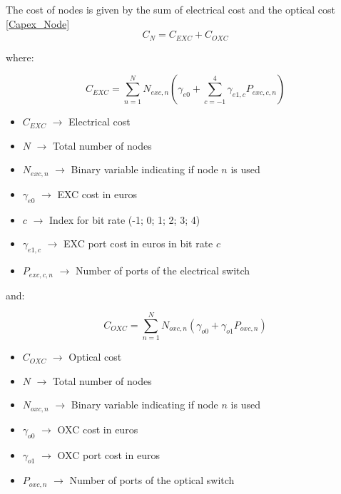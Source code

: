 The cost of nodes is given by the sum of electrical cost and the optical cost \ref{Capex_Node}\\

\begin{equation}
C_N = C_{EXC} + C_{OXC}
\label{Capex_Node}
\end{equation}

where:

\begin{equation}
C_{EXC} = \sum_{n=1}^{N} N_{exc,n} \left( \gamma_{e0} + \sum_{c=-1}^4 \gamma_{e1,c} P_{exc,c,n} \right)
\label{Capex_Node_EXC}
\end{equation}

\begin{itemize}
\item{$C_{EXC}$			$\rightarrow$	Electrical cost}
\item{$N$				$\rightarrow$	Total number of nodes}
\item{$N_{exc,n}$		$\rightarrow$	Binary variable indicating if node $n$ is used}
\item{$\gamma_{e0}$ 	$\rightarrow$	EXC cost in euros}
\item{$c$               $\rightarrow$   Index for bit rate (-1; 0; 1; 2; 3; 4)}
\item{$\gamma_{e1,c}$	$\rightarrow$	EXC port cost in euros in bit rate $c$}
\item{$P_{exc,c,n}$	    $\rightarrow$	Number of ports of the electrical switch}
\end{itemize}

and:

\begin{equation}
C_{OXC} = \sum_{n=1}^{N} N_{oxc,n} ( \gamma_{o0} + \gamma_{o1} P_{oxc,n} )
\label{Capex_Node_OXC}
\end{equation}

\begin{itemize}
\item{$C_{OXC}$			$\rightarrow$	Optical cost}
\item{$N$				$\rightarrow$	Total number of nodes}
\item{$N_{oxc,n}$		$\rightarrow$	Binary variable indicating if node $n$ is used}
\item{$\gamma_{o0}$ 	$\rightarrow$	OXC cost in euros}
\item{$\gamma_{o1}$ 	$\rightarrow$	OXC port cost in euros }
\item{$P_{oxc,n}$	    $\rightarrow$	Number of ports of the optical switch}
\end{itemize}


